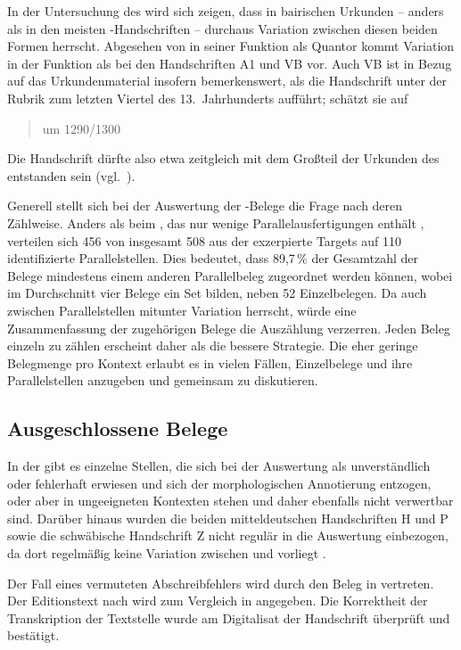 In der Untersuchung des \CAO{} wird sich zeigen, dass in
bairischen Urkunden -- anders als in den meisten
\KC{}-Handschriften -- durchaus Variation zwischen diesen beiden Formen
herrscht. Abgesehen von  in seiner Funktion als Quantor kommt
Variation in der Funktion als  bei den Handschriften A1 und VB
vor. Auch VB ist in Bezug auf das Urkundenmaterial insofern bemerkenswert, als
\citet[224]{schneider1987} die Handschrift unter der Rubrik zum letzten Viertel
des 13.~Jahrhunderts aufführt; \citet[65]{wolf:kckat} schätzt sie auf
\blockquote{um 1290/1300}. Die Handschrift dürfte also etwa
zeitgleich mit dem Großteil der Urkunden des \CAO{} entstanden sein
(vgl.~).

Generell stellt sich bei der Auswertung der \KC{}-Belege die Frage nach deren
Zählweise. Anders als beim \CAO{}, das nur wenige
Parallelausfertigungen enthält
\autocite[vgl.][326--328]{ganslmayeretal2003}, verteilen sich 456 von insgesamt
508 aus der \KC{} exzerpierte Targets auf 110 identifizierte Parallelstellen.
Dies bedeutet, dass 89,7\,\% der Gesamtzahl der Belege mindestens einem anderen
Parallelbeleg zugeordnet werden können, wobei im Durchschnitt vier Belege ein
Set bilden, neben 52 Einzelbelegen. Da auch zwischen Parallelstellen mitunter
Variation herrscht, würde eine Zusammenfassung der zugehörigen Belege die
Auszählung verzerren. Jeden Beleg einzeln zu zählen erscheint daher als die
bessere Strategie. Die eher geringe Belegmenge pro Kontext erlaubt es in vielen
Fällen, Einzelbelege und ihre Parallelstellen anzugeben und gemeinsam zu
diskutieren.

\subsection{Ausgeschlossene Belege}
\label{subsec:ausgeschlossene_kc}

In der \KC{} gibt es einzelne Stellen, die sich bei der Auswertung als
unverständlich oder fehlerhaft erwiesen und sich der morphologischen
Annotierung entzogen, oder aber in ungeeigneten Kontexten stehen und daher
ebenfalls nicht verwertbar sind. Darüber hinaus wurden die beiden
mitteldeutschen Handschriften H und P sowie die
schwäbische Handschrift Z nicht regulär in die Auswertung
einbezogen, da dort regelmäßig keine Variation zwischen  und
 vorliegt \autocite[vgl. auch][183]{ksw2}.

Der Fall eines vermuteten Abschreibfehlers wird durch den Beleg in
 vertreten. Der Editionstext nach \citet{schroeder1895}
wird zum Vergleich in  angegeben. Die Korrektheit der
Transkription der Textstelle wurde am Digitalisat der
Handschrift überprüft und bestätigt.

